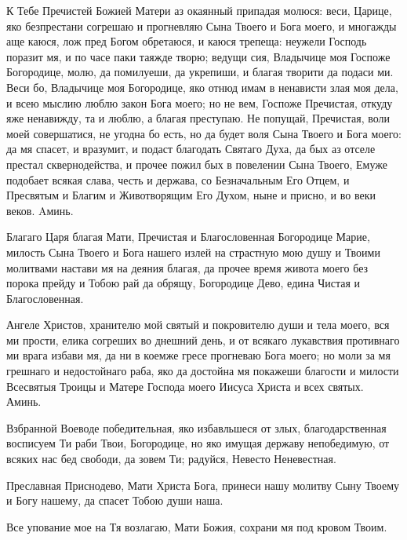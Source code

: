 \begin{mymulticols}

К Тебе Пречистей Божией Матери аз окаянный припадая молюся: веси, Царице, яко безпрестани согрешаю и прогневляю Сына Твоего и Бога моего, и многажды аще каюся, лож пред Богом обретаюся, и каюся трепеща: неужели Господь поразит мя, и по часе паки таяжде творю; ведущи сия, Владычице моя Госпоже Богородице, молю, да помилуеши, да укрепиши, и благая творити да подаси ми. Веси бо, Владычице моя Богородице, яко отнюд имам в ненависти злая моя дела, и всею мыслию люблю закон Бога моего; но не вем, Госпоже Пречистая, откуду яже ненавижду, та и люблю, а благая преступаю. Не попущай, Пречистая, воли моей совершатися, не угодна бо есть, но да будет воля Сына Твоего и Бога моего: да мя спасет, и вразумит, и подаст благодать Святаго Духа, да бых аз отселе престал сквернодейства, и прочее пожил бых в повелении Сына Твоего, Емуже подобает всякая слава, честь и держава, со Безначальным Его Отцем, и Пресвятым и Благим и Животворящим Его Духом, ныне и присно, и во веки веков. Aминь.


Благаго Царя благая Мати, Пречистая и Благословенная Богородице Марие, милость Сына Твоего и Бога нашего излей на страстную мою душу и Твоими молитвами настави мя на деяния благая, да прочее время живота моего без порока прейду и Тобою рай да обрящу, Богородице Дево, едина Чистая и Благословенная.


Ангеле Христов, хранителю мой святый и покровителю души и тела моего, вся ми прости, елика согреших во днешний день, и от всякаго лукавствия противнаго ми врага избави мя, да ни в коемже гресе прогневаю Бога моего; но моли за мя грешнаго и недостойнаго раба, яко да достойна мя покажеши благости и милости Всесвятыя Троицы и Матере Господа моего Иисуса Христа и всех святых. Аминь.


Взбранной Воеводе победительная, яко избавльшеся от злых, благодарственная восписуем Ти раби Твои, Богородице, но яко имущая державу непобедимую, от всяких нас бед свободи, да зовем Ти; радуйся, Невесто Неневестная.

Преславная Приснодево, Мати Христа Бога, принеси нашу молитву Сыну Твоему и Богу нашему, да спасет Тобою души наша.

Все упование мое на Тя возлагаю, Мати Божия, сохрани мя под кровом Твоим.


\end{mymulticols}
